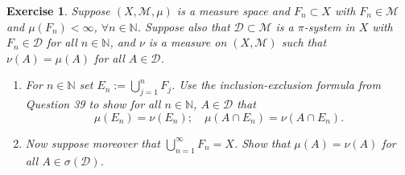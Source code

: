 \documentclass{article}
\newtheorem{exercise}[theorem]{Exercise}
\begin{document}
\begin{exercise}
Suppose \( (X, \mathcal{M}, \mu) \) is a measure space and \( F_n \subset X \) with \( F_n \in \mathcal{M} \) and \( \mu(F_n) < \infty \), \( \forall n \in \mathbb{N} \). Suppose also that \( \mathcal{D} \subset \mathcal{M} \) is a \(\pi\)-system in \( X \) with \( F_n \in \mathcal{D} \) for all \( n \in \mathbb{N} \), and \( \nu \) is a measure on \( (X, \mathcal{M}) \) such that \( \nu(A) = \mu(A) \) for all \( A \in \mathcal{D} \).
    
    \begin{enumerate}
        \item[(a)] For \( n \in \mathbb{N} \) set \( E_n := \bigcup_{j=1}^{n} F_j \). Use the inclusion-exclusion formula from Question 39 to show for all \( n \in \mathbb{N} \), \( A \in \mathcal{D} \) that
        \[
        \mu(E_n) = \nu(E_n); \quad \mu(A \cap E_n) = \nu(A \cap E_n).
        \]
        \item[(b)] Now suppose moreover that \( \bigcup_{n=1}^{\infty} F_n = X \). Show that \( \mu(A) = \nu(A) \) for all \( A \in \sigma(\mathcal{D}) \).
    \end{enumerate}
\end{exercise}
\end{document}
